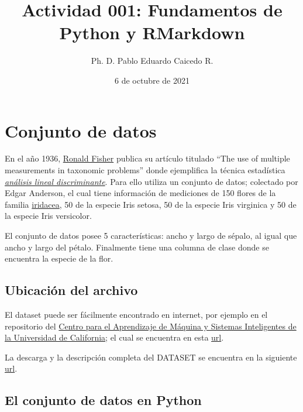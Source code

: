 \documentclass[11pt,]{article}
\title{Actividad 001: Fundamentos de Python y RMarkdown}
\author{Ph. D. Pablo Eduardo Caicedo R.}
\date{6 de octubre de 2021}
\begin{document}
\maketitle

\thispagestyle{firststyle}


{
\hypersetup{linkcolor=black}
\setcounter{tocdepth}{3}
\tableofcontents
}

\hypertarget{conjunto-de-datos}{%
\section{Conjunto de datos}\label{conjunto-de-datos}}

En el año 1936,
\href{https://es.wikipedia.org/wiki/Ronald_Fisher}{Ronald Fisher}
publica su artículo titulado ``The use of multiple measurements in
taxonomic problems'' donde ejemplifica la técnica estadística
\href{https://es.wikipedia.org/wiki/An\%C3\%A1lisis_discriminante_lineal}{\emph{análisis
lineal discriminante}}. Para ello utiliza un conjunto de datos;
colectado por Edgar Anderson, el cual tiene información de mediciones de
150 flores de la familia
\href{https://es.wikipedia.org/wiki/Iridaceae}{iridacea}, 50 de la
especie Iris setosa, 50 de la especie Iris virginica y 50 de la especie
Iris versicolor.

El conjunto de datos posee 5 características: ancho y largo de sépalo,
al igual que ancho y largo del pétalo. Finalmente tiene una columna de
clase donde se encuentra la especie de la flor.

\hypertarget{ubicaciuxf3n-del-archivo}{%
\subsection{Ubicación del archivo}\label{ubicaciuxf3n-del-archivo}}

El dataset puede ser fácilmente encontrado en internet, por ejemplo en
el repositorio del \href{https://cml.ics.uci.edu/}{Centro para el
Aprendizaje de Máquina y Sistemas Inteligentes de la Universidad de
California}; el cual se encuentra en esta
\href{https://archive.ics.uci.edu/ml/index.php}{url}.

La descarga y la descripción completa del DATASET se encuentra en la
siguiente \href{https://archive.ics.uci.edu/ml/datasets/iris}{url}.

\hypertarget{el-conjunto-de-datos-en-python}{%
\subsection{El conjunto de datos en
Python}\label{el-conjunto-de-datos-en-python}}
\end{document}
